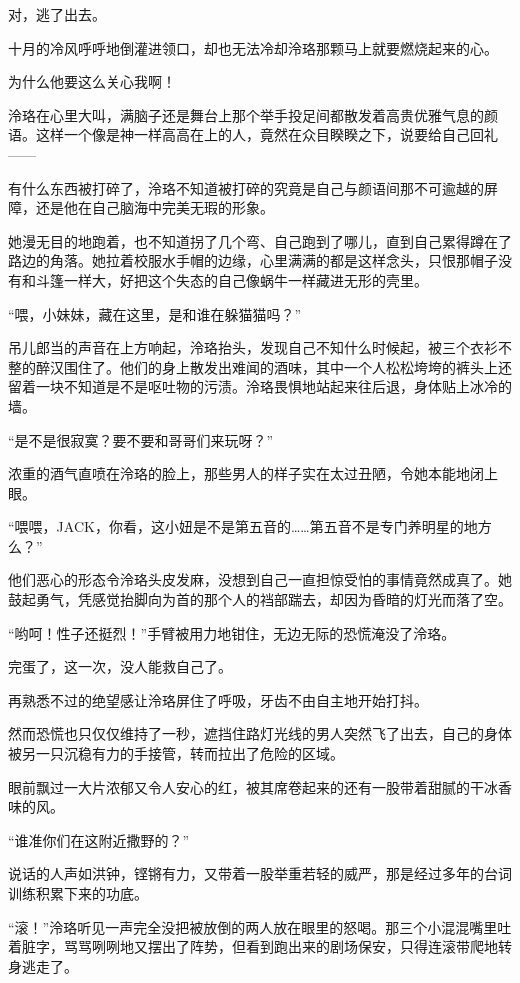 \documentclass[UTF8, scheme = chinese, openany]{ctexbook}
\begin{document}
对，逃了出去。

十月的冷风呼呼地倒灌进领口，却也无法冷却泠珞那颗马上就要燃烧起来的心。

为什么他要这么关心我啊！

泠珞在心里大叫，满脑子还是舞台上那个举手投足间都散发着高贵优雅气息的颜语。这样一个像是神一样高高在上的人，竟然在众目睽睽之下，说要给自己回礼——

有什么东西被打碎了，泠珞不知道被打碎的究竟是自己与颜语间那不可逾越的屏障，还是他在自己脑海中完美无瑕的形象。

她漫无目的地跑着，也不知道拐了几个弯、自己跑到了哪儿，直到自己累得蹲在了路边的角落。她拉着校服水手帽的边缘，心里满满的都是这样念头，只恨那帽子没有和斗篷一样大，好把这个失态的自己像蜗牛一样藏进无形的壳里。

“喂，小妹妹，藏在这里，是和谁在躲猫猫吗？”

吊儿郎当的声音在上方响起，泠珞抬头，发现自己不知什么时候起，被三个衣衫不整的醉汉围住了。他们的身上散发出难闻的酒味，其中一个人松松垮垮的裤头上还留着一块不知道是不是呕吐物的污渍。泠珞畏惧地站起来往后退，身体贴上冰冷的墙。

“是不是很寂寞？要不要和哥哥们来玩呀？”

浓重的酒气直喷在泠珞的脸上，那些男人的样子实在太过丑陋，令她本能地闭上眼。

“喂喂，JACK，你看，这小妞是不是第五音的……第五音不是专门养明星的地方么？”

他们恶心的形态令泠珞头皮发麻，没想到自己一直担惊受怕的事情竟然成真了。她鼓起勇气，凭感觉抬脚向为首的那个人的裆部踹去，却因为昏暗的灯光而落了空。

“哟呵！性子还挺烈！”手臂被用力地钳住，无边无际的恐慌淹没了泠珞。

完蛋了，这一次，没人能救自己了。

再熟悉不过的绝望感让泠珞屏住了呼吸，牙齿不由自主地开始打抖。

然而恐慌也只仅仅维持了一秒，遮挡住路灯光线的男人突然飞了出去，自己的身体被另一只沉稳有力的手接管，转而拉出了危险的区域。

眼前飘过一大片浓郁又令人安心的红，被其席卷起来的还有一股带着甜腻的干冰香味的风。

“谁准你们在这附近撒野的？”

说话的人声如洪钟，铿锵有力，又带着一股举重若轻的威严，那是经过多年的台词训练积累下来的功底。

“滚！”泠珞听见一声完全没把被放倒的两人放在眼里的怒喝。那三个小混混嘴里吐着脏字，骂骂咧咧地又摆出了阵势，但看到跑出来的剧场保安，只得连滚带爬地转身逃走了。
\end{document}
